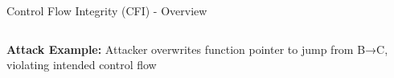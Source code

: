 \documentclass[aspectratio=169,12pt]{beamer}
\begin{document}
\begin{frame}{Control Flow Integrity (CFI) - Overview}
\begin{columns}
\begin{column}{0.5\textwidth}
            
            \vspace{0.3cm}
            \begin{tcolorbox}[colback=yellow!10]
                \small
                \textbf{Attack Example:}
                Attacker overwrites function pointer to jump from B→C, violating intended control flow
            \end{tcolorbox}
        \end{column}
    \end{columns}
\end{frame}
\end{document}
